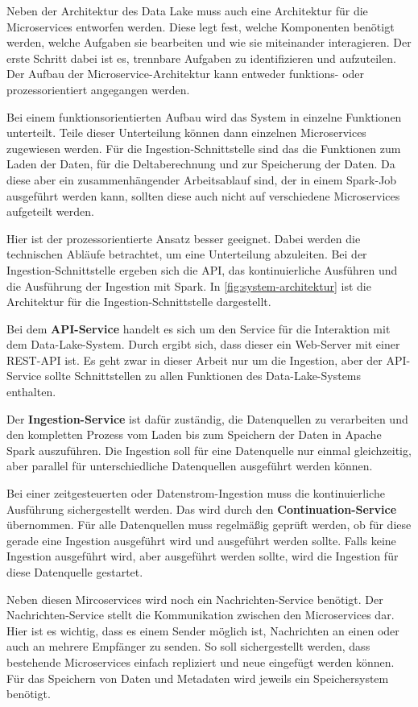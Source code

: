 Neben der Architektur des Data Lake muss auch eine Architektur für die Microservices entworfen werden.
Diese legt fest, welche Komponenten benötigt werden, welche Aufgaben sie bearbeiten und wie sie miteinander interagieren.
Der erste Schritt dabei ist es, trennbare Aufgaben zu identifizieren und aufzuteilen.
Der Aufbau der Microservice-Architektur kann entweder funktions- oder prozessorientiert angegangen werden.

Bei einem funktionsorientierten Aufbau wird das System in einzelne Funktionen unterteilt.
Teile dieser Unterteilung können dann einzelnen Microservices zugewiesen werden.
Für die Ingestion-Schnittstelle sind das die Funktionen zum Laden der Daten, für die Deltaberechnung und zur Speicherung der Daten.
Da diese aber ein zusammenhängender Arbeitsablauf sind, der in einem Spark-Job ausgeführt werden kann, sollten diese auch nicht auf verschiedene Microservices aufgeteilt werden.

Hier ist der prozessorientierte Ansatz besser geeignet.
Dabei werden die technischen Abläufe betrachtet, um eine Unterteilung abzuleiten.
Bei der Ingestion-Schnittstelle ergeben sich die API, das kontinuierliche Ausführen und die Ausführung der Ingestion mit Spark.
In \cref{fig:system-architektur} ist die Architektur für die Ingestion-Schnittstelle dargestellt.

Bei dem \textbf{API-Service} handelt es sich um den Service für die Interaktion mit dem Data-Lake-System.
Durch  ergibt sich, dass dieser ein Web-Server mit einer REST-API ist.
Es geht zwar in dieser Arbeit nur um die Ingestion, aber der API-Service sollte Schnittstellen zu allen Funktionen des Data-Lake-Systems enthalten.

Der \textbf{Ingestion-Service} ist dafür zuständig, die Datenquellen zu verarbeiten und den kompletten Prozess vom Laden bis zum Speichern der Daten in Apache Spark auszuführen.
Die Ingestion soll für eine Datenquelle nur einmal gleichzeitig, aber parallel für unterschiedliche Datenquellen ausgeführt werden können.

Bei einer zeitgesteuerten oder Datenstrom-Ingestion muss die kontinuierliche Ausführung sichergestellt werden.
Das wird durch den \textbf{Continuation-Service} übernommen.
Für alle Datenquellen muss regelmäßig geprüft werden, ob für diese gerade eine Ingestion ausgeführt wird und ausgeführt werden sollte.
Falls keine Ingestion ausgeführt wird, aber ausgeführt werden sollte, wird die Ingestion für diese Datenquelle gestartet.

Neben diesen Mircoservices wird noch ein Nachrichten-Service benötigt.
Der Nachrichten-Service stellt die Kommunikation zwischen den Microservices dar.
Hier ist es wichtig, dass es einem Sender möglich ist, Nachrichten an einen oder auch an mehrere Empfänger zu senden.
So soll sichergestellt werden, dass bestehende Microservices einfach repliziert und neue eingefügt werden können.
Für das Speichern von Daten und Metadaten wird jeweils ein Speichersystem benötigt.

